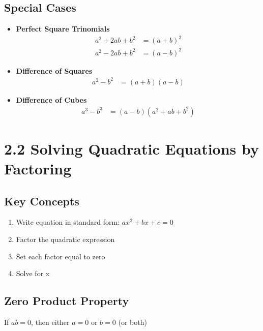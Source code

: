 \documentclass[12pt]{article}
\begin{document}
\subsection*{Special Cases}
\begin{tcolorbox}[colback=lightgray,colframe=secondary,title=Special Factoring Patterns]
    \begin{itemize}
        \item \textbf{Perfect Square Trinomials}
        \begin{align*}
            a^2 + 2ab + b^2 &= (a + b)^2 \\
            a^2 - 2ab + b^2 &= (a - b)^2
        \end{align*}
        
        \item \textbf{Difference of Squares}
        \begin{align*}
            a^2 - b^2 &= (a + b)(a - b)
        \end{align*}
        
        \item \textbf{Difference of Cubes}
        \begin{align*}
            a^3 - b^3 &= (a - b)(a^2 + ab + b^2)
        \end{align*}
    \end{itemize}
\end{tcolorbox}

\section{2.2 Solving Quadratic Equations by Factoring}
\subsection*{Key Concepts}
\begin{tcolorbox}[colback=lightgray,colframe=primary,title=Steps to Solve by Factoring]
    \begin{enumerate}
        \item Write equation in standard form: $ax^2 + bx + c = 0$
        \item Factor the quadratic expression
        \item Set each factor equal to zero
        \item Solve for x
    \end{enumerate}
\end{tcolorbox}

\subsection*{Zero Product Property}
\begin{tcolorbox}[colback=lightgray,colframe=secondary,title=Important Property]
    If $ab = 0$, then either $a = 0$ or $b = 0$ (or both)
\end{tcolorbox}
\end{document}
